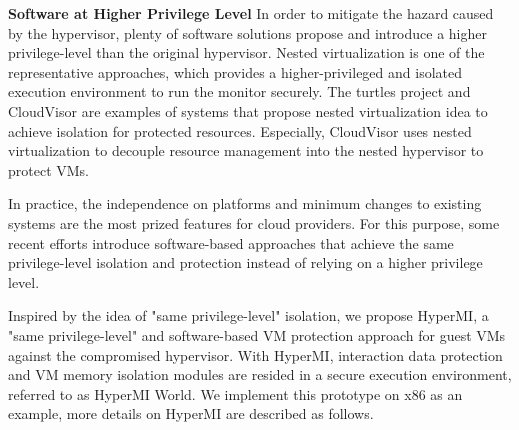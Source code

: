 \documentclass[conference]{IEEEtran}
\begin{document}
 
\textbf{Software at Higher Privilege Level}
In order to mitigate the hazard caused by the hypervisor, plenty of software solutions propose and introduce a higher privilege-level than the original hypervisor. Nested virtualization is one of the representative approaches, which provides a higher-privileged and isolated execution environment to run the monitor securely. The turtles project \cite{Ben2007The} and CloudVisor \cite{Zhang2011CloudVisor} are examples of systems that propose nested virtualization idea to achieve isolation for protected resources. Especially, CloudVisor uses nested virtualization to decouple resource management into the nested hypervisor to protect VMs. %

In practice, the independence on platforms and minimum changes to existing systems are the most prized features for cloud providers. For this purpose,
some recent efforts introduce software-based approaches that achieve the same privilege-level isolation and protection instead of relying on a higher privilege level. 



Inspired by the idea of "same privilege-level" isolation, we propose HyperMI, a "same privilege-level" and software-based VM protection approach for guest VMs against the compromised hypervisor. 
With HyperMI, interaction data protection and VM memory isolation modules are resided in a secure execution environment, referred to as HyperMI World.
We implement this prototype on x86 as an example, more details on HyperMI are described as follows.
\end{document}
